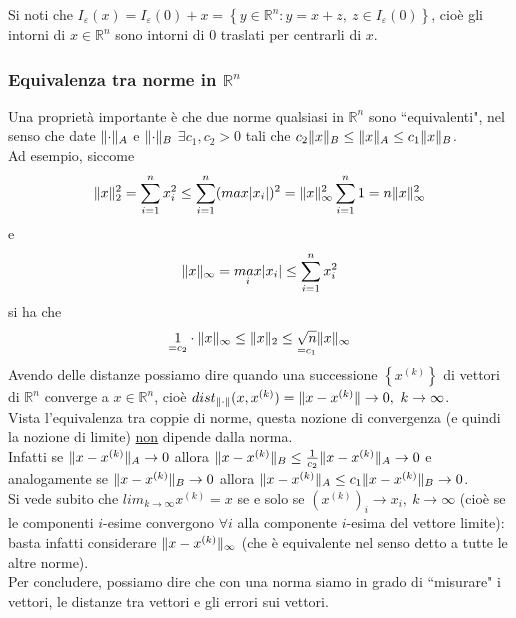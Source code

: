 \documentclass[12pt,a4paper]{article}
\DeclarePairedDelimiter{\norma}{\lVert}{\rVert}
\begin{document}
Si noti che $I_\varepsilon(x) = I_\varepsilon(0) + x = \left\{ y \in \mathbb{R}^n : y = x+z, \ z \in I_\varepsilon(0) \right\}$,
cioè gli intorni di $x \in \mathbb{R}^n$ sono intorni di 0 traslati per centrarli di $x$.

\subsubsection{Equivalenza tra norme in $\mathbb{R}^n$}
Una proprietà importante è che due norme qualsiasi in $\mathbb{R}^n$ sono ``equivalenti", nel senso che date $\norma{\cdot}_A$ e $\norma{\cdot}_B$ $\exists c_1, c_2 > 0$ tali che  $c_2\norma{x}_B \leq \norma{x}_A \leq c_1\norma{x}_B$. \\
Ad esempio, siccome 
\begin{equation*}
        \norma{x}_2^2 = \sum_{i=1}^n x_i^2 \leq \sum_{i=1}^n (max\lvert x_i \rvert)^2 = \norma{x}_\infty^2 \sum_{i=1}^n 1 = n \norma{x}_\infty^2
\end{equation*}
e
\begin{equation*}
    \norma{x}_\infty = \underset{i}{max}\lvert x_i \rvert \leq \sum_{i=1}^n x_i^2
\end{equation*}
si ha che 
\begin{equation*}
    \underset{=c_2}{1} \cdot \norma{x}_\infty \leq \norma{x}_2 \leq \underset{=c_1}{\sqrt{n}} \norma{x}_\infty
\end{equation*}
Avendo delle distanze possiamo dire quando una successione $\left\{ x^{(k)} \right\}$ di vettori di $\mathbb{R}^n$ converge a $x \in \mathbb{R}^n$, cioè $dist_{\norma{\cdot}}(x,x^{(k)}) = \norma{x-x^{(k)}} \rightarrow 0, \ k \rightarrow \infty$.\\
Vista l'equivalenza tra coppie di norme, questa nozione di convergenza (e quindi la nozione di limite) \uline{non} dipende dalla norma.\\
Infatti se $\norma{x-x^{(k)}}_A \rightarrow 0$ allora $\norma{x-x^{(k)}}_B \leq \frac{1}{c_2}\norma{x-x^{(k)}}_A \rightarrow 0$ e analogamente se $\norma{x-x^{(k)}}_B \rightarrow 0$ allora $\norma{x-x^{(k)}}_A \leq c_1 \norma{x-x^{(k)}}_B \rightarrow 0$. \\
Si vede subito che $lim_{k\to \infty} x^{(k)} = x$
se e solo se $(x^{(k)})_i \rightarrow x_i, \ k \to \infty$ (cioè se le componenti $i$-esime convergono $\forall i$ alla componente $i$-esima del vettore limite): basta infatti considerare $\norma{x-x^{(k)}}_\infty$ (che è equivalente nel senso detto a tutte le altre norme).\\
Per concludere, possiamo dire che con una norma siamo in grado di ``misurare" i vettori, le distanze tra vettori e gli errori sui vettori.
\end{document}
